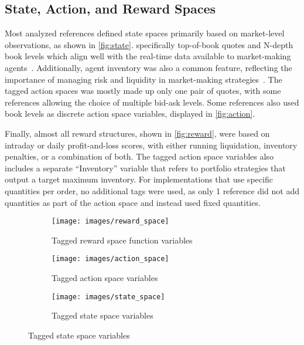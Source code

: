 \subsection{State, Action, and Reward Spaces}
\label{subsec:spaces}

Most analyzed references defined state spaces primarily based on market-level observations, as shown in \autoref{fig:state}.
specifically top-of-book quotes and N-depth book levels which align well with the real-time data available to market-making agents~\cite{He2023, Bakshaev2020}.
Additionally, agent inventory was also a common feature, reflecting the importance of managing risk and liquidity in market-making strategies~\cite{Patel2018, Ganesh2019}.
The tagged action spaces was mostly made up only one pair of quotes, with some references allowing the choice of multiple bid-ask levels.
Some references also used book levels as discrete action space variables, displayed in \autoref{fig:action}.

Finally, almost all reward structures, shown in \autoref{fig:reward},
were based on intraday or daily profit-and-loss scores, with either running liquidation, inventory penalties, or a combination of both.
The tagged action space variables also includes a separate ``Inventory'' variable that refers to portfolio strategies that output a target maximum inventory.
For implementations that use specific quantities per order, no additional tags were used,
as only 1 reference did not add quantities as part of the action space and instead used fixed quantities.

\begin{figure}
    \centering
    \begin{subfigure}{.6\columnwidth}
        \centering
        \texttt{[image: images/reward\_space]}
        \caption{Tagged reward space function variables}
        \label{fig:reward}
    \end{subfigure}
    \vspace{0.5em}
    \begin{subfigure}{.6\columnwidth}
        \centering
        \texttt{[image: images/action\_space]}
        \caption{Tagged action space variables}
        \label{fig:action}
    \end{subfigure}
    \vspace{0.5em} %
    \begin{subfigure}{.6\columnwidth}
        \centering
        \texttt{[image: images/state\_space]}
        \caption{Tagged state space variables}
        \label{fig:state}
    \end{subfigure}
\end{figure}

